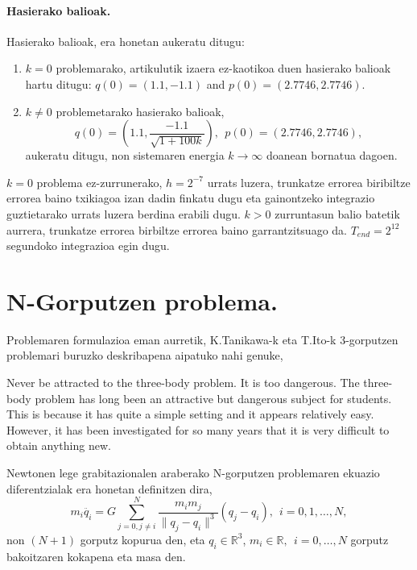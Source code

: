 \paragraph*{Hasierako balioak.}
Hasierako balioak, era honetan aukeratu ditugu:
\begin{enumerate}
\item  $k=0$ problemarako, \cite{Dumitru} artikulutik izaera ez-kaotikoa duen hasierako balioak hartu ditugu: $q(0)=(1.1, -1.1)$ and $p(0)=(2.7746,2.7746)$.

\item  $k\neq 0$ problemetarako hasierako balioak,
\begin{equation*}
q(0)=\left(1.1, \frac{-1.1}{\sqrt{1+100k}}\right), \ \ 
p(0)=(2.7746,2.7746),
\end{equation*}
aukeratu ditugu, non sistemaren energia $k \rightarrow \infty$ doanean bornatua dagoen.

\end{enumerate}

$k=0$ problema ez-zurrunerako, $h=2^{-7}$ urrats luzera, trunkatze errorea biribiltze errorea baino txikiagoa izan dadin finkatu dugu eta gainontzeko integrazio guztietarako urrats luzera berdina erabili dugu. $k>0$ zurruntasun balio batetik aurrera, trunkatze errorea birbiltze errorea baino garrantzitsuago da. $T_{end}=2^{12}$  segundoko integrazioa egin dugu. 

\section{N-Gorputzen problema.}
\label{s:33}

Problemaren formulazioa eman aurretik, K.Tanikawa-k eta T.Ito-k \cite{Ito2007} 3-gorputzen problemari buruzko deskribapena aipatuko nahi genuke,

\begin{displayquote}
Never be attracted to the three-body problem. It is too dangerous. The three-body problem has long been an attractive but dangerous subject for students. This is because it has quite a simple setting and it appears relatively easy. However, it has been investigated for so many years that it is very difficult to obtain anything new.
\end{displayquote}

Newtonen lege grabitazionalen araberako N-gorputzen problemaren ekuazio diferentzialak era honetan definitzen dira,
\begin{equation}
m_i\ddot{q_i}= G \sum_{j=0,j \neq i}^{N} \frac{m_im_j}{\|q_j-q_i\|^3} (q_j-q_i) , \ \  i=0,1,\dots, N,
\end{equation}
non $(N+1)$ gorputz kopurua den, eta $q_i\in \mathbb{R}^3$, $m_i \in \mathbb{R}, \ \ i=0,\dots,N$ gorputz bakoitzaren kokapena eta masa den. 

